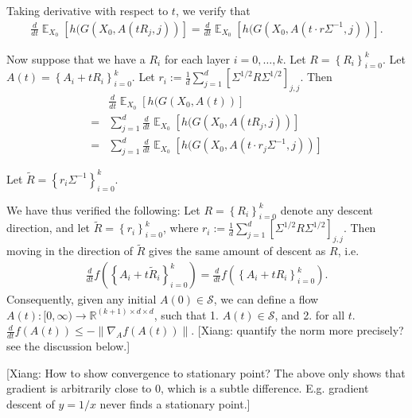 \documentclass{article}
\DeclareMathOperator{\E}{\mathbb{E}}
\newcommand{\R}{\mathbb{R}}
\renewcommand{\S}{{\mathcal S}}
\newcommand*\lrb[1]{\left[ #1 \right]}
\newcommand*\lrn[1]{\left\| #1 \right\|}
\newcommand*\lrp[1]{\left( #1 \right)}
\newcommand*\lrbb[1]{\left\{ #1 \right\}}
\newcommand{\xc}[1]{{\color{black!2!green} [Xiang: #1]}}
\begin{document}
Taking derivative with respect to $t$, we verify that
\begin{align*}
\frac{d}{dt} \E_{X_0}\lrb{h(G(X_0, A(tR_j, j))} = \frac{d}{dt} \E_{X_0}\lrb{h(G(X_0, A(t\cdot r \Sigma^{-1}, j))}.
\end{align*}

Now suppose that we have a $R_i$ for each layer $i=0,\dots,k$. Let ${R} = \lrbb{{R}_i}_{i=0}^k$. Let ${A}(t) = \lrbb{A_i + t{R}_i}_{i=0}^k$. Let ${r}_i := \frac{1}{d} \sum_{j=1}^d \lrb{\Sigma^{1/2} R \Sigma^{1/2}}_{j,j}$. Then
\begin{align*}
& \frac{d}{dt} \E_{X_0}\lrb{h(G(X_0, {A}(t))}\\
=& \sum_{j=1}^d \frac{d}{dt} \E_{X_0}\lrb{h(G(X_0, A(t{R}_j, j))}\\
=& \sum_{j=1}^d \frac{d}{dt} \E_{X_0}\lrb{h(G(X_0, A(t\cdot {r}_j \Sigma^{-1}, j))}
\end{align*}

Let $\tilde{R} = \lrbb{r_i \Sigma^{-1}}_{i=0}^k$. 

We have thus verified the following: Let $R= \lrbb{R_i}_{i=0}^k$ denote any descent direction, and let $\tilde{R}= \lrbb{r_i}_{i=0}^k$, where $r_i := \frac{1}{d} \sum_{j=1}^d \lrb{\Sigma^{1/2} R \Sigma^{1/2}}_{j,j}$. Then moving in the direction of $\tilde{R}$ gives the same amount of descent as $R$, i.e.
\begin{align*}
\frac{d}{dt} f\lrp{\lrbb{A_i + t\tilde{R}_i}_{i=0}^k} = \frac{d}{dt} f\lrp{\lrbb{A_i + t R_i}_{i=0}^k}.
\end{align*}
Consequently, given any initial $A(0) \in \S$, we can define a flow $A(t) : [0,\infty) \to \R^{(k+1)\times d \times d}$, such that 1. $A(t) \in \S$, and 2. for all $t$. $\frac{d}{dt} f(A(t)) \leq -\lrn{\nabla_A f(A(t))}$. \xc{quantify the norm more precisely? see the discussion below.}

\xc{How to show convergence to stationary point? The above only shows that gradient is arbitrarily close to $0$, which is a subtle difference. E.g. gradient descent of $y = 1/x$ never finds a stationary point.}
\end{document}
